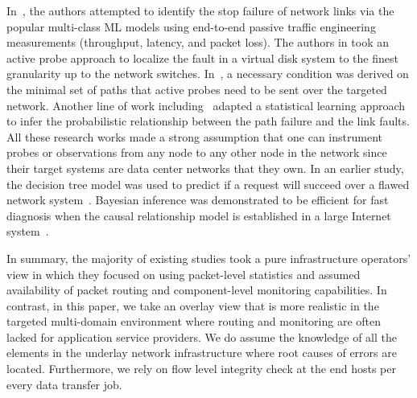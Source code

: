 In~\cite{Link-JIoT-2019}, the authors attempted to identify the stop failure of network links via the popular multi-class ML models using end-to-end passive traffic engineering measurements (throughput, latency, and packet loss). The authors in \cite{DeepView:NSDI18} took an active probe approach to localize the fault in a virtual disk system to the finest granularity up to the network switches. In~\cite{netbouncer:nsdi18}, a necessary condition was derived on the minimal set of paths that active probes need to be sent over the targeted network. Another line of work including~\cite{NetPoirot:Sigcomm2016,KDD14} adapted a statistical learning approach to infer the probabilistic relationship between the path failure and the link faults. All these research works made a strong assumption that one can instrument probes or observations from any node to any other node in the network since their target systems are data center networks that they own. In an earlier study, the decision tree model was used to predict if a request will succeed over a flawed network system~\cite{DT:2004}. Bayesian inference was demonstrated to be efficient for fast diagnosis when the causal relationship model is established in a large Internet system~\cite{BN-Internet:2007}.

In summary, the majority of existing studies took a pure infrastructure operators' view in which they focused on using packet-level statistics and assumed availability of packet routing and component-level monitoring capabilities. 
In contrast, in this paper, we take an overlay view that is more realistic in the targeted multi-domain environment where routing and monitoring are often lacked for application service providers. We do assume the knowledge of all the elements in the 
underlay network infrastructure where root causes of errors are located. Furthermore, we rely on flow level integrity check at the end hosts per every data transfer job.

